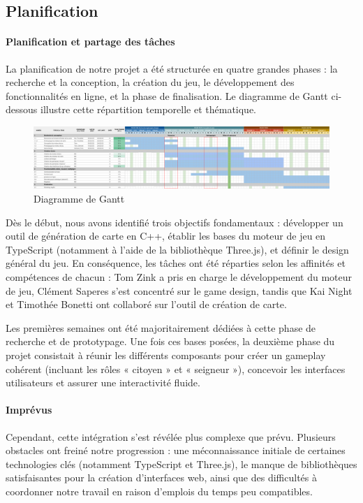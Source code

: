 

\subsection{Planification}

\paragraph{Planification et partage des tâches}

La planification de notre projet a été structurée en quatre grandes phases : la recherche et la conception, la création du jeu, le développement des fonctionnalités en ligne, et la phase de finalisation. Le diagramme de Gantt ci-dessous illustre cette répartition temporelle et thématique. 

\begin{figure}[!h]
    \centering
    \includegraphics[width=0.99\linewidth]{images/gantt.png}
    \caption{Diagramme de Gantt}
    \label{fig:enter-label}
\end{figure}


Dès le début, nous avons identifié trois objectifs fondamentaux : développer un outil de génération de carte en C++, établir les bases du moteur de jeu en TypeScript (notamment à l’aide de la bibliothèque Three.js), et définir le design général du jeu. En conséquence, les tâches ont été réparties selon les affinités et compétences de chacun : Tom Zink a pris en charge le développement du moteur de jeu, Clément Saperes s’est concentré sur le game design, tandis que Kai Night et Timothée Bonetti ont collaboré sur l’outil de création de carte.

Les premières semaines ont été majoritairement dédiées à cette phase de recherche et de prototypage. Une fois ces bases posées, la deuxième phase du projet consistait à réunir les différents composants pour créer un gameplay cohérent (incluant les rôles « citoyen » et « seigneur »), concevoir les interfaces utilisateurs et assurer une interactivité fluide.


\paragraph{Imprévus}
Cependant, cette intégration s’est révélée plus complexe que prévu. Plusieurs obstacles ont freiné notre progression : une méconnaissance initiale de certaines technologies clés (notamment TypeScript et Three.js), le manque de bibliothèques satisfaisantes pour la création d'interfaces web, ainsi que des difficultés à coordonner notre travail en raison d’emplois du temps peu compatibles.


